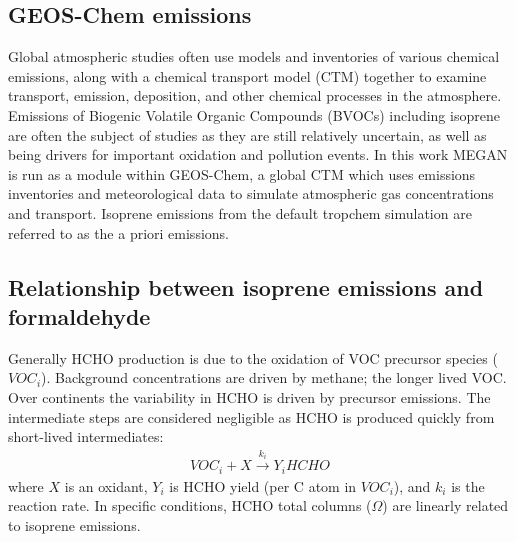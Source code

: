     
  \subsection{GEOS-Chem emissions}
  
    Global atmospheric studies often use models and inventories of various chemical emissions, along with a chemical transport model (CTM) together to examine transport, emission, deposition, and other chemical processes in the atmosphere.
    Emissions of Biogenic Volatile Organic Compounds (BVOCs) including isoprene are often the subject of studies as they are still relatively uncertain, as well as being drivers for important oxidation and pollution events.
    In this work MEGAN is run as a module within GEOS-Chem, a global CTM which uses emissions inventories and meteorological data to simulate atmospheric gas concentrations and transport.
    Isoprene emissions from the default tropchem simulation are referred to as the a priori emissions.
    
  
  \subsection{Relationship between isoprene emissions and formaldehyde}
    \label{BioIsop:method:slope}
    
    
    Generally HCHO production is due to the oxidation of VOC precursor species ($VOC_i$).
    Background concentrations are driven by methane; the longer lived VOC.
    Over continents the variability in HCHO is driven by precursor emissions.
    The intermediate steps are considered negligible as HCHO is produced quickly from short-lived intermediates:
    \begin{eqnarray*}
      VOC_i + X \overset{k_i}{\rightarrow} Y_i HCHO
    \end{eqnarray*}
    where $X$ is an oxidant, $Y_i$ is HCHO yield (per C atom in $VOC_i$), and $k_i$ is the reaction rate.
    In specific conditions, HCHO total columns ($\Omega$\moleccm) are linearly related to isoprene emissions.
    
